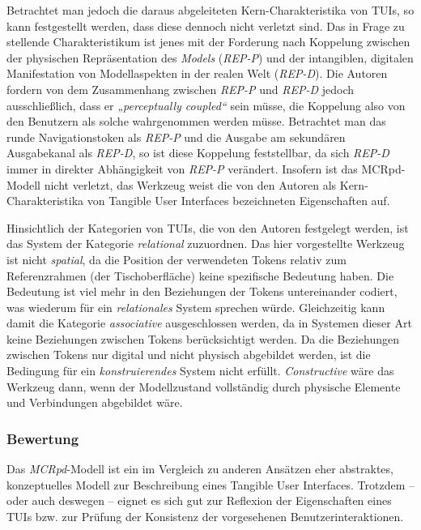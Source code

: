 Betrachtet man jedoch die daraus abgeleiteten Kern-Charakteristika von \glspl{TUI}, so kann festgestellt werden, dass diese dennoch nicht verletzt sind. Das in Frage zu stellende Charakteristikum ist jenes mit der Forderung nach Koppelung zwischen der physischen Repräsentation des \emph{Models} (\emph{REP-P}) und der intangiblen, digitalen Manifestation von Modellaspekten in der realen Welt (\emph{REP-D}). Die Autoren fordern von dem Zusammenhang zwischen \emph{REP-P} und \emph{REP-D} jedoch ausschließlich, dass er \emph{„perceptually coupled“} sein müsse, die Koppelung also von den Benutzern als solche wahrgenommen werden müsse. Betrachtet man das runde Navigationstoken als \emph{REP-P} und die Ausgabe am sekundären Ausgabekanal als \emph{REP-D}, so ist diese Koppelung feststellbar, da sich \emph{REP-D} immer in direkter Abhängigkeit von \emph{REP-P} verändert. Insofern ist das \gls{MCRpd}-Modell nicht verletzt, das Werkzeug weist die von den Autoren als Kern-Charakteristika von Tangible User Interfaces bezeichneten Eigenschaften auf.

Hinsichtlich der Kategorien von \glspl{TUI}, die von den Autoren festgelegt werden, ist das System der Kategorie \emph{relational} zuzuordnen. Das hier vorgestellte Werkzeug ist nicht \emph{spatial}, da die Position der verwendeten Tokens relativ zum Referenzrahmen (der Tischoberfläche) keine spezifische Bedeutung haben. Die Bedeutung ist viel mehr in den Beziehungen der Tokens untereinander codiert, was wiederum für ein \emph{relationales} System sprechen würde. Gleichzeitig kann damit die Kategorie \emph{associative} ausgeschlossen werden, da in Systemen dieser Art keine Beziehungen zwischen Tokens berücksichtigt werden. Da die Beziehungen zwischen Tokens nur digital und nicht physisch abgebildet werden, ist die Bedingung für ein \emph{konstruierendes} System nicht erfüllt. \emph{Constructive} wäre das Werkzeug dann, wenn der Modellzustand vollständig durch physische Elemente und Verbindungen abgebildet wäre.

\subsubsection{Bewertung}

Das \emph{MCRpd}-Modell ist ein im Vergleich zu anderen Ansätzen eher abstraktes, konzeptuelles Modell zur Beschreibung eines Tangible User Interfaces. Trotzdem -- oder auch deswegen -- eignet es sich gut zur Reflexion der Eigenschaften eines \glspl{TUI} bzw. zur Prüfung der Konsistenz der vorgesehenen Benutzerinteraktionen.

